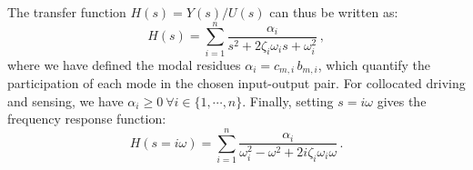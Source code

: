 \documentclass[../Thesis-IJspeert.tex]{subfiles}
\begin{document}
The transfer function $H(s)=Y(s)/U(s)$ can thus be written as:
\begin{equation}
H(s) = \sum_{i=1}^{n} \frac{\alpha_{i}}{s^{2} + 2 \zeta_{i} \omega_{i} s + \omega_{i}^{2}}\,,
\end{equation}
where we have defined the modal residues $\alpha_{i} = c_{m,i} \,b_{m,i}$, which quantify the participation of each mode in the chosen input-output pair. For collocated driving and sensing, we have $\alpha_{i}\geq 0\ \forall i\in\{1,\cdots,n\}$. Finally, setting $s=i\omega$ gives the frequency response function:
\begin{equation}
\label{freqtransferfunction}
H(s=i\omega) = \sum_{i=1}^{n} \frac{\alpha_{i}}{\omega_{i}^{2}-\omega^{2} + 2i \zeta_{i} \omega_{i} \omega}\,.
\end{equation}
\end{document}
